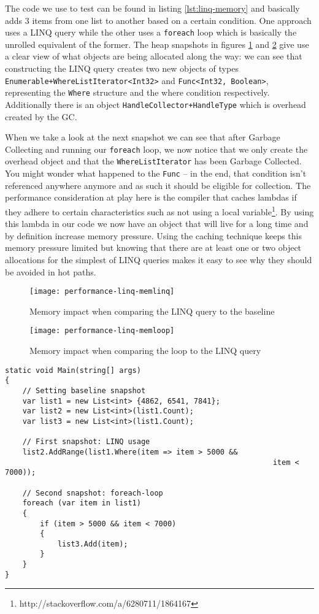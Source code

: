 The code we use to test can be found in listing \ref{lst:linq-memory} and basically adds 3 items from one list to another based on a certain condition. One approach uses a LINQ query while the other uses a \verb|foreach| loop which is basically the unrolled equivalent of the former. The heap snapshots in figures \ref{img:performance-linq-memlinq} and \ref{img:performance-linq-memloop} give use a clear view of what objects are being allocated along the way: we can see that constructing the LINQ query creates two new objects of types \verb|Enumerable+WhereListIterator<Int32>| and \verb|Func<Int32, Boolean>|, representing the \verb|Where| structure and the where condition respectively. Additionally there is an object \verb|HandleCollector+HandleType| which is overhead created by the GC. 

When we take a look at the next snapshot we can see that after Garbage Collecting and running our \verb|foreach| loop, we now notice that we only create the overhead object and that the \verb|WhereListIterator| has been Garbage Collected. You might wonder what happened to the \verb|Func| -- in the end, that condition isn't referenced anywhere anymore and as such it should be eligible for collection. The performance consideration at play here is the compiler that caches lambdas if they adhere to certain characteristics such as not using a local variable\footnote{http://stackoverflow.com/a/6280711/1864167}. By using this lambda in our code we now have an object that will live for a long time and by definition increase memory pressure. Using the caching technique keeps this memory pressure limited but knowing that there are at least one or two object allocations for the simplest of LINQ queries makes it easy to see why they should be avoided in hot paths.


\begin{figure}[h]
\centering
\texttt{[image: performance-linq-memlinq]}
\caption{Memory impact when comparing the LINQ query to the baseline}
\label{img:performance-linq-memlinq}
\end{figure}

\begin{figure}[h]
\centering
\texttt{[image: performance-linq-memloop]}
\caption{Memory impact when comparing the loop to the LINQ query}
\label{img:performance-linq-memloop}
\end{figure}

\begin{lstlisting}[label={lst:linq-memory}]
static void Main(string[] args)
{
    // Setting baseline snapshot
    var list1 = new List<int> {4862, 6541, 7841};
    var list2 = new List<int>(list1.Count);
    var list3 = new List<int>(list1.Count);

    // First snapshot: LINQ usage
    list2.AddRange(list1.Where(item => item > 5000 && 
															 item < 7000));

    // Second snapshot: foreach-loop
    foreach (var item in list1)
    {
        if (item > 5000 && item < 7000)
        {
            list3.Add(item);
        }
    }
}
\end{lstlisting}
